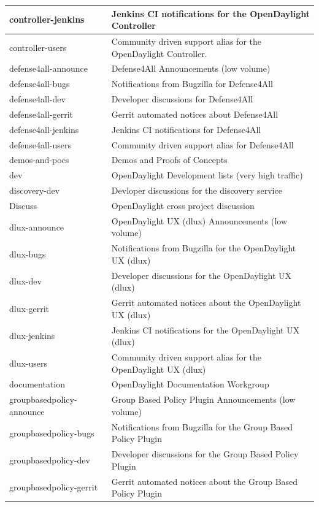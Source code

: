 \documentclass[a4paper, 12pt]{book}
\begin{document}
{\begin{longtable}{|p{4cm}|p{10cm}|}
controller-jenkins &	Jenkins CI notifications for the OpenDaylight Controller \\ \hline
controller-users &	Community driven support alias for the OpenDaylight Controller. \\ \hline
defense4all-announce &	Defense4All Announcements (low volume) \\ \hline
defense4all-bugs &	Notifications from Bugzilla for Defense4All \\ \hline
defense4all-dev &	Developer discussions for Defense4All \\ \hline
defense4all-gerrit &	Gerrit automated notices about Defense4All \\ \hline
defense4all-jenkins &	Jenkins CI notifications for Defense4All \\ \hline
defense4all-users &	Community driven support alias for Defense4All \\ \hline
demos-and-pocs &	Demos and Proofs of Concepts \\ \hline
dev &	OpenDaylight Development lists (very high traffic) \\ \hline
discovery-dev &	Devloper discussions for the discovery service \\ \hline
Discuss &	OpenDaylight cross project discussion \\ \hline
dlux-announce &	OpenDaylight UX (dlux) Announcements (low volume) \\ \hline
dlux-bugs &	Notifications from Bugzilla for the OpenDaylight UX (dlux) \\ \hline
dlux-dev &	Developer discussions for the OpenDaylight UX (dlux) \\ \hline
dlux-gerrit &	Gerrit automated notices about the OpenDaylight UX (dlux) \\ \hline
dlux-jenkins &	Jenkins CI notifications for the OpenDaylight UX (dlux) \\ \hline
dlux-users &	Community driven support alias for the OpenDaylight UX (dlux) \\ \hline
documentation &	OpenDaylight Documentation Workgroup \\ \hline
groupbasedpolicy-announce &	Group Based Policy Plugin Announcements (low volume) \\ \hline
groupbasedpolicy-bugs &	Notifications from Bugzilla for the Group Based Policy Plugin \\ \hline
groupbasedpolicy-dev &	Developer discussions for the Group Based Policy Plugin \\ \hline
groupbasedpolicy-gerrit &	Gerrit automated notices about the Group Based Policy Plugin \\ \hline

\end{longtable}}
\end{document}
